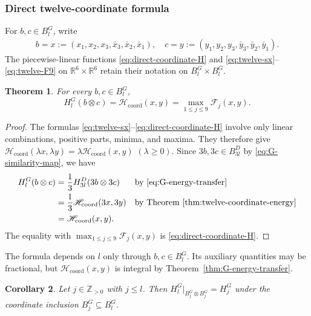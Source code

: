 \documentclass[11pt,reqno]{amsart}
\newcommand{\Z}{\mathbb Z}
\numberwithin{table}{section}
\numberwithin{equation}{section}
\theoremstyle{plain}
\newtheorem{theorem}{Theorem}[section]
\newtheorem{corollary}[theorem]{Corollary}
\theoremstyle{definition}
\begin{document}
\subsubsection{Direct twelve-coordinate formula}

For \(b,c\in B_l^G\), write
\[
\begin{aligned}
	b=x:=(x_1,x_2,x_3,\bar x_3,\bar x_2,\bar x_1),\quad
	c=y:=(y_1,y_2,y_3,\bar y_3,\bar y_2,\bar y_1).
\end{aligned}
\]
The piecewise-linear functions
\eqref{eq:direct-coordinate-H} and
\eqref{eq:twelve-sx}--\eqref{eq:twelve-F9} on
\(\mathbb R^6\times\mathbb R^6\) retain their notation on
\(B_l^G\times B_l^G\).

\begin{theorem}
	\label{thm:G-direct-coordinate-energy}
	For every \(b,c\in B_l^G\),
	\begin{equation}\label{eq:G-direct-coordinate-energy}
		H_l^G(b\otimes c)
		=
		\mathscr H_{\mathrm{coord}}(x,y)
		=
		\max_{1\le j\le9}\mathcal F_j(x,y).
	\end{equation}
\end{theorem}

\begin{proof}
	The formulas \eqref{eq:twelve-sx}--\eqref{eq:direct-coordinate-H}
	involve only linear combinations, positive parts, minima, and maxima.
	They therefore give $\mathscr H_{\mathrm{coord}}(\lambda x,\lambda y)
	=
	\lambda\mathscr H_{\mathrm{coord}}(x,y)$ $(\lambda\ge0)$.
Since \(3b,3c\in B_{3l}^D\) by \eqref{eq:G-similarity-map}, we have
	\[
	\begin{aligned}
		H_l^G(b\otimes c)
		&=
		\frac13H_{3l}^D(3b\otimes3c)
		&&\text{by \eqref{eq:G-energy-transfer}}\\
		&=
		\frac13\mathscr H_{\mathrm{coord}}(3x,3y)
		&&\text{by Theorem~\ref{thm:twelve-coordinate-energy}}\\
		&=
		\mathscr H_{\mathrm{coord}}(x,y).
	\end{aligned}
	\]
	The equality with
	\(\max_{1\le j\le9}\mathcal F_j(x,y)\)
	is \eqref{eq:direct-coordinate-H}.
\end{proof}

The formula depends on \(l\) only through \(b,c\in B_l^G\).
Its auxiliary quantities may be fractional, but
\(\mathscr H_{\mathrm{coord}}(x,y)\) is integral by
Theorem~\ref{thm:G-energy-transfer}.

\begin{corollary}
	\label{cor:G-level-stability}
	Let \(j\in\Z_{>0}\) with \(j\le l\).
	Then \(H_l^G\big|_{B_j^G\otimes B_j^G}=H_j^G\)
	under the coordinate inclusion \(B_j^G\subseteq B_l^G\).
\end{corollary}
\end{document}
